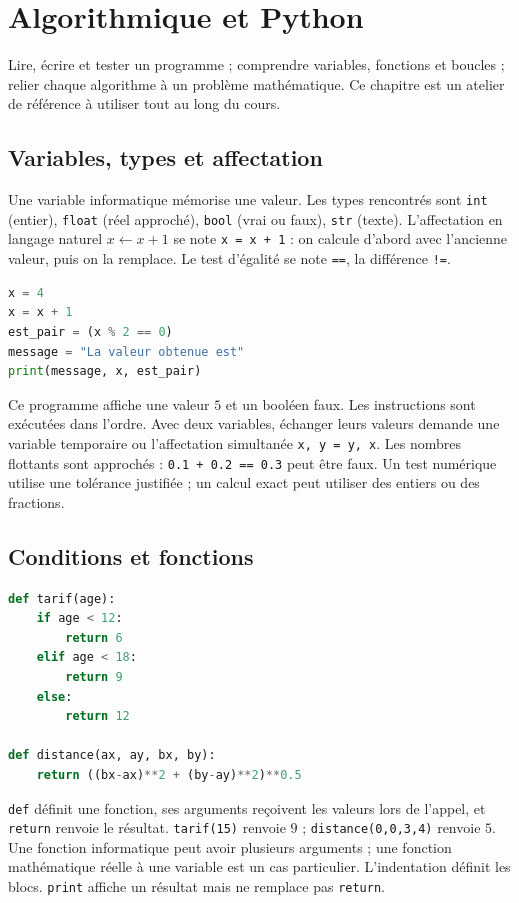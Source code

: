 \documentclass[../cours_2de.tex]{subfiles}
\begin{document}
\setcounter{chapter}{22}
\chapter{Algorithmique et Python}
\label{sec:ch23}
\begin{objectif}
Lire, écrire et tester un programme ; comprendre variables, fonctions et boucles ; relier chaque algorithme à un problème mathématique. Ce chapitre est un atelier de référence à utiliser tout au long du cours.
\end{objectif}
\section{Variables, types et affectation}
Une variable informatique mémorise une valeur. Les types rencontrés sont
\texttt{int} (entier), \texttt{float} (réel approché), \texttt{bool} (vrai ou faux), \texttt{str} (texte).
L'affectation en langage naturel $x\leftarrow x+1$ se note \texttt{x = x + 1} : on calcule d'abord avec l'ancienne valeur, puis on la remplace.
Le test d'égalité se note \texttt{==}, la différence \texttt{!=}.
\begin{lstlisting}[language=Python]
x = 4
x = x + 1
est_pair = (x % 2 == 0)
message = "La valeur obtenue est"
print(message, x, est_pair)
\end{lstlisting}
Ce programme affiche une valeur $5$ et un booléen faux. Les instructions sont exécutées dans l'ordre.
Avec deux variables, échanger leurs valeurs demande une variable temporaire ou l'affectation simultanée \texttt{x, y = y, x}.
Les nombres flottants sont approchés : \texttt{0.1 + 0.2 == 0.3} peut être faux. Un test numérique utilise une tolérance justifiée ; un calcul exact peut utiliser des entiers ou des fractions.
\section{Conditions et fonctions}
\begin{lstlisting}[language=Python]
def tarif(age):
    if age < 12:
        return 6
    elif age < 18:
        return 9
    else:
        return 12

def distance(ax, ay, bx, by):
    return ((bx-ax)**2 + (by-ay)**2)**0.5
\end{lstlisting}
\texttt{def} définit une fonction, ses arguments reçoivent les valeurs lors de l'appel, et \texttt{return} renvoie le résultat.
\texttt{tarif(15)} renvoie $9$ ; \texttt{distance(0,0,3,4)} renvoie $5$.
Une fonction informatique peut avoir plusieurs arguments ; une fonction mathématique réelle à une variable est un cas particulier.
L'indentation définit les blocs. \texttt{print} affiche un résultat mais ne remplace pas \texttt{return}.
\end{document}
